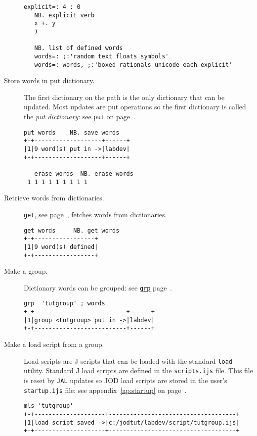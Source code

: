 \begin{description}
\begin{lstlisting}[frame=single,framerule=0pt]
   explicit=: 4 : 0
   NB. explicit verb
   x +. y
   )
   
   NB. list of defined words
   words=: ;:'random text floats symbols'
   words=: words, ;:'boxed rationals unicode each explicit'
\end{lstlisting}

\item[Store words in put dictionary.] The first dictionary on the path is the
only dictionary that can be updated.  Most updates are put
operations so the first dictionary is called the \emph{put dictionary}\label{xr:putdic}: see
\hyperlink{il:put}{\texttt{put}} on page~\pageref{ss:put}.
\begin{lstlisting}[frame=single,framerule=0pt]
   put words    NB. save words
+-+-------------------+------+
|1|9 word(s) put in ->|labdev|
+-+-------------------+------+

   erase words  NB. erase words
 1 1 1 1 1 1 1 1 1
\end{lstlisting}

\item[Retrieve words from dictionaries.] \hyperlink{il:get}{\texttt{get}}, see 
page~\pageref{ss:get}, fetches words from dictionaries.  
\begin{lstlisting}[frame=single,framerule=0pt]
   get words     NB. get words
+-+-----------------+
|1|9 word(s) defined|
+-+-----------------+
\end{lstlisting}

\item[Make a group.] Dictionary words can be grouped: see \hyperlink{il:grp}{\texttt{grp}} 
page~\pageref{ss:grp}.  
\begin{lstlisting}[frame=single,framerule=0pt]
   grp  'tutgroup' ; words
+-+--------------------------+------+
|1|group <tutgroup> put in ->|labdev|
+-+--------------------------+------+
\end{lstlisting}

\item[Make a load script from a group.] Load scripts are J scripts that can be loaded
with the standard \texttt{load} utility.  Standard J load scripts are defined in the \verb|scripts.ijs| file.  This file is reset by \texttt{JAL} updates
so JOD load scripts are stored in the user's \verb|startup.ijs| file: 
see appendix~\ref{ap:startup} on page~\pageref{ap:startup}.
\begin{lstlisting}[frame=single,framerule=0pt]
   mls 'tutgroup'
+-+--------------------+------------------------------------+
|1|load script saved ->|c:/jodtut/labdev/script/tutgroup.ijs|
+-+--------------------+------------------------------------+


\end{lstlisting}
\end{description}
